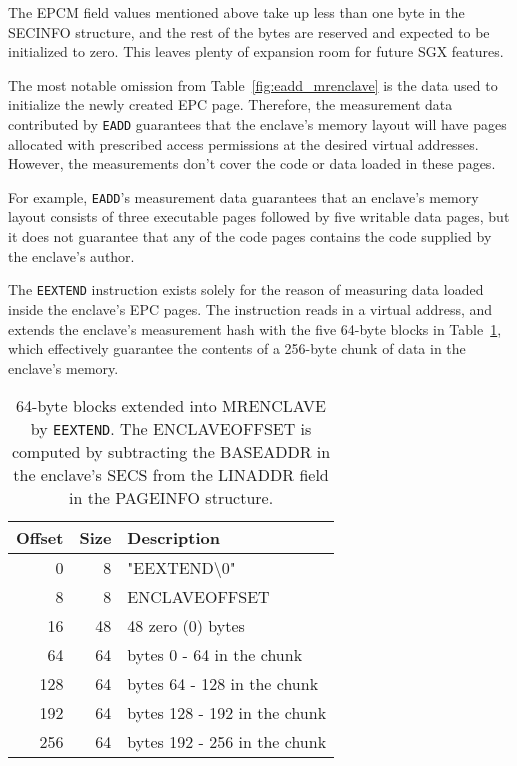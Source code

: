The EPCM field values mentioned above take up less than one byte in the SECINFO
structure, and the rest of the bytes are reserved and expected to be
initialized to zero. This leaves plenty of expansion room for future SGX
features.

The most notable omission from Table~\ref{fig:eadd_mrenclave} is the data used
to initialize the newly created EPC page. Therefore, the measurement data
contributed by \texttt{EADD} guarantees that the enclave's memory layout
will have pages allocated with prescribed access permissions at the desired
virtual addresses. However, the measurements don't cover the code or data
loaded in these pages.

For example, \texttt{EADD}'s measurement data guarantees that an enclave's
memory layout consists of three executable pages followed by five writable data
pages, but it does not guarantee that any of the code pages contains the
code supplied by the enclave's author.


\label{sec:sgx_eextend}


The \texttt{EEXTEND} instruction exists solely for the reason of measuring data
loaded inside the enclave's EPC pages. The instruction reads in a virtual
address, and extends the enclave's measurement hash with the five 64-byte
blocks in Table~\ref{fig:eextend_mrenclave}, which effectively guarantee the
contents of a 256-byte chunk of data in the enclave's memory.

\begin{table}[hbt]
  \centering
  \begin{tabularx}{\columnwidth}{| r | r | X |}
  \hline
  \textbf{Offset} & \textbf{Size} & \textbf{Description}\\
  \hline
  0 & 8 & "EEXTEND\textbackslash{}0" \\
  \hline
  8 & 8 & ENCLAVEOFFSET \\
  \hline
  16 & 48 & 48 zero (0) bytes \\
  \hline
  \hline
  64 & 64 & bytes 0 - 64 in the chunk \\
  \hline
  \hline
  128 & 64 & bytes 64 - 128 in the chunk \\
  \hline
  \hline
  192 & 64 & bytes 128 - 192 in the chunk \\
  \hline
  \hline
  256 & 64 & bytes 192 - 256 in the chunk \\
  \hline
  \end{tabularx}
  \caption{
    64-byte blocks extended into MRENCLAVE by \texttt{EEXTEND}. The
    ENCLAVEOFFSET is computed by subtracting the BASEADDR in the enclave's SECS
    from the LINADDR field in the PAGEINFO structure.
  }
  \label{fig:eextend_mrenclave}
\end{table}

